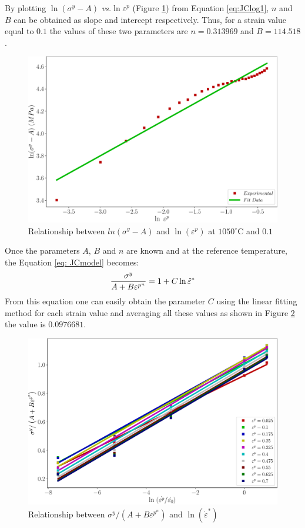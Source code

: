\documentclass[twoside,english,1p,final,sort&compress]{elsarticle}
\makeatletter
\theoremstyle{plain}
\newcommand{\mdot}[1]{\accentset{\mbox{\bfseries .}}{#1}}
\newcommand*{\versus}{\emph{vs.}\@\xspace}
\makeatother
\begin{document}
By plotting $\ln(\sigma^y-A)$ \versus $\ln\varepsilon^p$ (Figure \ref{fig:JCSigmaAB}) from Equation \ref{eq:JClog1}, $n$ and $B$ can be obtained as slope and intercept respectively. Thus, for a strain value equal to $0.1$ the values of these two parameters are $n=0.313969$ and $B=114.518$.
\begin{figure}[!ht]
\centering
\includegraphics[width=0.9\columnwidth]
{newFigures/JCSigmaAB}
\caption{Relationship between $ln(\sigma^y -A)$ and $\ln(\varepsilon^p)$ at $1050^\circ$C and $0.1$}
\label{fig:JCSigmaAB}
\end{figure}
\FloatBarrier
Once the parameters $A$, $B$ and $n$ are known and at the reference temperature, the Equation \ref{eq: JCmodel} becomes:
\begin{equation}
\frac{\sigma^y}{A + B\varepsilon^{p^n}} = 1 + C\ln\mdot{\varepsilon}^*
\end{equation}
From this equation one can easily obtain the parameter $C$ using the linear fitting method for each strain value and averaging all these values as shown in Figure \ref{fig:JCSigmaAB1} the value is $0.0976681$. 
\begin{figure}[!ht]
\centering
\includegraphics[width=0.9\columnwidth]
{newFigures/JCSigmaAB1}
\caption{Relationship between $\sigma^y/(A+ B\varepsilon^{p^n})$ and $\ln(\dot{\varepsilon}^*)$}
\label{fig:JCSigmaAB1}
\end{figure}
\end{document}

